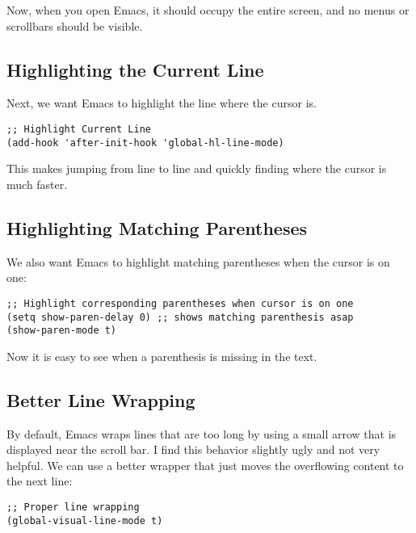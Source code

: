 \documentclass[12pt, a4paper]{article}
\begin{document}
Now, when you open Emacs, it should occupy the entire screen, and no menus or scrollbars should be visible.

\subsection{Highlighting the Current Line}
\label{sec:orgbf1a27d}

Next, we want Emacs to highlight the line where the cursor is.

\lstset{language=Lisp,label= ,caption= ,captionpos=b,numbers=none}
\begin{lstlisting}
;; Highlight Current Line
(add-hook 'after-init-hook 'global-hl-line-mode)
\end{lstlisting}

This makes jumping from line to line and quickly finding where the cursor is much faster.

\subsection{Highlighting Matching Parentheses}
\label{sec:orgcf8b3bf}

We also want Emacs to highlight matching parentheses when the cursor is on one:

\lstset{language=Lisp,label= ,caption= ,captionpos=b,numbers=none}
\begin{lstlisting}
;; Highlight corresponding parentheses when cursor is on one
(setq show-paren-delay 0) ;; shows matching parenthesis asap
(show-paren-mode t)
\end{lstlisting}

Now it is easy to see when a parenthesis is missing in the text.

\subsection{Better Line Wrapping}
\label{sec:org935525c}

By default, Emacs wraps lines that are too long by using a small arrow that is displayed near the scroll bar. I find this behavior slightly ugly and not very helpful. We can use a better wrapper that just moves the overflowing content to the next line:

\lstset{language=Lisp,label= ,caption= ,captionpos=b,numbers=none}
\begin{lstlisting}
;; Proper line wrapping
(global-visual-line-mode t)
\end{lstlisting}
\end{document}
